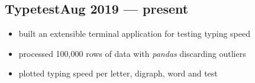 \documentclass{article}
\begin{document}


\subsection{Typetest\hfill Aug 2019 --- present}
\begin{itemize}
  \itemsep0em
  \item built an extensible terminal application for testing typing speed
  \item processed 100,000 rows of data with \textit{pandas} discarding outliers
  \item plotted typing speed per letter, digraph, word and test
\end{itemize}

\end{document}
